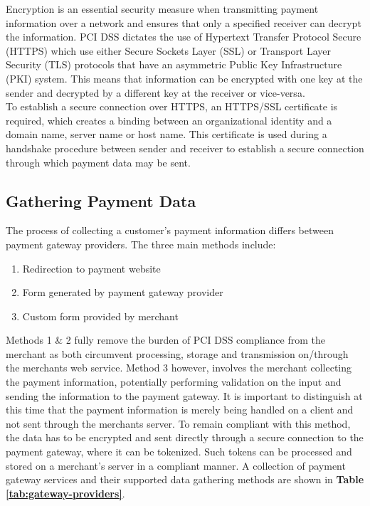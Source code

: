Encryption is an essential security measure when transmitting payment information over a network and ensures that only a specified receiver can decrypt the information. PCI DSS dictates the use of Hypertext Transfer Protocol Secure (HTTPS) which use either Secure Sockets Layer (SSL) or Transport Layer Security (TLS) protocols that have an asymmetric Public Key Infrastructure (PKI) system. This means that information can be encrypted with one key at the sender and decrypted by a different key at the receiver or vice-versa\cite{comodo}.\\ 

To establish a secure connection over HTTPS, an HTTPS/SSL certificate is required, which creates a binding between an organizational identity and a domain name, server name or host name\cite{ssl-certificate}. This certificate is used during a handshake procedure between sender and receiver to establish a secure connection through which payment data may be sent.

\subsection{Gathering Payment Data}
\label{subsec:gathering-payment-data}

The process of collecting a customer's payment information differs between payment gateway providers. The three main methods include:

\begin{enumerate}
	\item Redirection to payment website
    \item Form generated by payment gateway provider
    \item Custom form provided by merchant
\end{enumerate}

Methods 1 \& 2 fully remove the burden of PCI DSS compliance from the merchant as both circumvent processing, storage and transmission on/through the merchants web service. Method 3 however, involves the merchant collecting the payment information, potentially performing validation on the input and sending the information to the payment gateway. It is important to distinguish at this time that the payment information is merely being handled on a client and not sent through the merchants server. To remain compliant with this method, the data has to be encrypted and sent directly through a secure connection to the payment gateway, where it can be tokenized. Such tokens can be processed and stored on a merchant's server in a compliant manner. A collection of payment gateway services and their supported data gathering methods are shown in \textbf{Table \ref{tab:gateway-providers}}. \\

